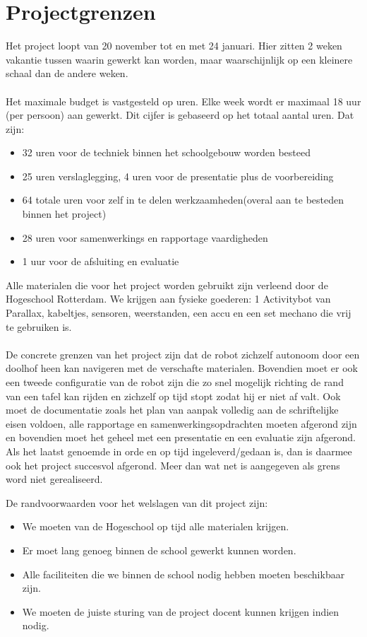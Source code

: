 \documentclass[oneside]{book}
\begin{document}
\clearpage
\chapter{Projectgrenzen}
Het project loopt van 20 november tot en met 24 januari. Hier zitten 2 weken vakantie tussen
waarin gewerkt kan worden, maar waarschijnlijk op een kleinere schaal dan de andere weken.\\
\\
Het maximale budget is vastgesteld op uren. Elke week wordt er maximaal 18 uur (per persoon) aan
gewerkt.
Dit cijfer is gebaseerd op het totaal aantal uren.
Dat zijn: 
\begin{itemize}
\item 32 uren voor de techniek binnen het schoolgebouw worden besteed
\item 25 uren verslaglegging, 4 uren voor de presentatie plus de voorbereiding
\item 64 totale uren voor zelf in te delen werkzaamheden(overal aan te besteden binnen het project)
\item 28 uren voor samenwerkings en rapportage vaardigheden  
\item 1 uur voor de afsluiting en evaluatie
\end{itemize}
Alle materialen die voor het project worden gebruikt zijn verleend door de Hogeschool
Rotterdam.
We krijgen aan fysieke goederen: 1 Activitybot van Parallax, kabeltjes, sensoren, weerstanden, een
accu en een set mechano die vrij te gebruiken is.\\
\\
De concrete grenzen van het project zijn dat de robot zichzelf
autonoom door een doolhof heen kan navigeren met
de verschafte materialen. 
Bovendien moet er ook een tweede configuratie van de robot zijn die zo snel
mogelijk richting de rand van een tafel kan rijden en zichzelf op tijd stopt zodat hij er niet af valt.
Ook moet de documentatie zoals het plan van aanpak volledig aan de schriftelijke eisen voldoen, alle rapportage
en samenwerkingsopdrachten moeten
afgerond zijn en bovendien moet het geheel met een presentatie en een evaluatie zijn afgerond.
Als het laatst genoemde in orde en op tijd ingeleverd/gedaan is, dan is daarmee ook het project
succesvol afgerond.
Meer dan wat net is aangegeven als grens word niet gerealiseerd.

De randvoorwaarden voor het welslagen van dit project zijn: 
\begin{itemize}
\item We moeten van de Hogeschool op tijd alle materialen krijgen.
\item Er moet lang genoeg binnen de school gewerkt kunnen worden.
\item Alle faciliteiten die we binnen de school nodig hebben moeten beschikbaar zijn.
\item We moeten de juiste sturing van de project docent kunnen krijgen indien nodig.
\end{itemize}
\clearpage
\end{document}
